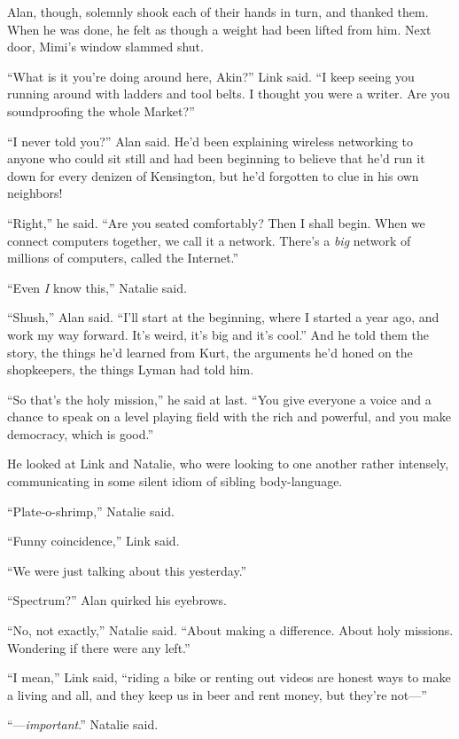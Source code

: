Alan, though, solemnly shook each of their hands in turn, and thanked
them.  When he was done, he felt as though a weight had been lifted
from him.  Next door, Mimi's window slammed shut.

``What is it you're doing around here, Akin?'' Link said.  ``I keep
seeing you running around with ladders and tool belts.  I thought you
were a writer.  Are you soundproofing the whole Market?''

``I never told you?'' Alan said.  He'd been explaining wireless
networking to anyone who could sit still and had been beginning to
believe that he'd run it down for every denizen of Kensington, but
he'd forgotten to clue in his own neighbors!

``Right,'' he said.  ``Are you seated comfortably?  Then I shall
begin.  When we connect computers together, we call it a network. 
There's a \textit{big} network of millions of computers, called the
Internet.''

``Even \textit{I} know this,'' Natalie said.

``Shush,'' Alan said.  ``I'll start at the beginning, where I started
a year ago, and work my way forward.  It's weird, it's big and it's
cool.'' And he told them the story, the things he'd learned from Kurt,
the arguments he'd honed on the shopkeepers, the things Lyman had told
him.

``So that's the holy mission,'' he said at last.  ``You give everyone
a voice and a chance to speak on a level playing field with the rich
and powerful, and you make democracy, which is good.''

He looked at Link and Natalie, who were looking to one another rather
intensely, communicating in some silent idiom of sibling
body-language.

``Plate-o-shrimp,'' Natalie said.

``Funny coincidence,'' Link said.

``We were just talking about this yesterday.''

``Spectrum?'' Alan quirked his eyebrows.

``No, not exactly,'' Natalie said.  ``About making a difference. 
About holy missions.  Wondering if there were any left.''

``I mean,'' Link said, ``riding a bike or renting out videos are
honest ways to make a living and all, and they keep us in beer and
rent money, but they're not---''

``---\textit{important}.'' Natalie said.

